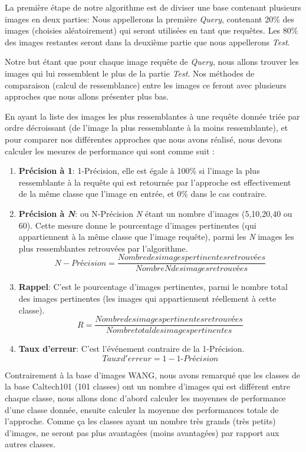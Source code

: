 	La première étape de notre algorithme est de diviser une base contenant plusieurs images en deux parties: Nous appellerons la première \textit{Query}, contenant 20\% des images (choisies aléatoirement) qui seront utilisées en tant que requêtes. Les 80\% des images restantes seront dans la deuxième partie que nous appellerons \textit{Test}.

	Notre but étant que pour chaque image requête de \textit{Query}, nous allons trouver les images qui lui ressemblent le plus de la partie \textit{Test}. Nos méthodes de comparaison (calcul de ressemblance) entre les images ce feront avec plusieurs approches que nous allons présenter plus bas.

	En ayant la liste des images les plus ressemblantes à une requête donnée triée par ordre décroissant (de l'image la plus ressemblante à la moins ressemblante), et pour comparer nos différentes approches que nous avons réalisé, nous devons calculer les mesures de performance qui sont comme suit : 
\begin{enumerate}

\item \textbf{Précision à 1}: 1-Précision, elle est égale à 100\% si l'image la plus ressemblante à la requête qui est retournée par l'approche est effectivement de la même classe que l'image en entrée, et 0\% dans le cas contraire.
\item \textbf{Précision à \textit{N}}: ou N-Précision \textit{N} étant un nombre d'images (5,10,20,40 ou 60). Cette mesure donne le pourcentage d'images  pertinentes (qui appartiennent à la même classe que l'image requête), parmi les \textit{N} images les plus ressemblantes retrouvées par l'algorithme.
$$N-Précision = \frac{Nombre des images pertinentes retrouvées}{Nombre N des images retrouvées}$$
\item \textbf{Rappel}: C'est le pourcentage d'images  pertinentes, parmi le nombre total des images pertinentes (les images qui appartiennent réellement à cette classe).
$$R = \dfrac{Nombre des images pertinentes retrouvées}{Nombre total des images pertinentes}$$
\item \textbf{Taux d'erreur}: C'est l’événement contraire de la 1-Précision.
$$Taux d'erreur = 1 - \textit{1-Précision}$$



\end{enumerate}

	Contrairement à la base d'images WANG, nous avons remarqué que les classes de la base Caltech101 (101 classes) ont un nombre d'images qui est différent entre chaque classe, nous allons donc d'abord calculer les moyennes de performance d'une classe donnée, ensuite calculer la moyenne des performances totale de l'approche. Comme ça les classes ayant un nombre très grands (très petits) d'images, ne seront pas plus avantagées (moins avantagées) par rapport aux autres classes.

